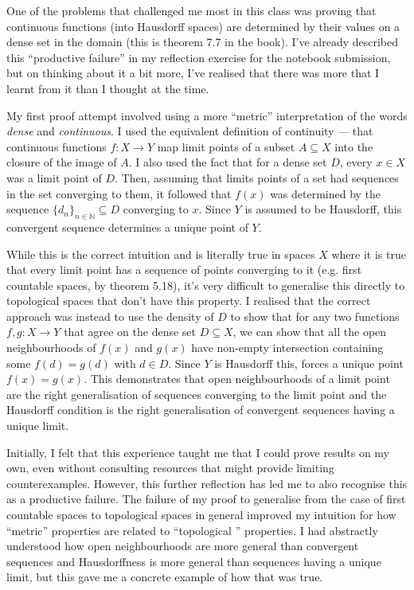 \documentclass[12 pt, letterpaper]{hmcpset}
\begin{document}
\begin{solution}
	One of the problems that challenged me most in this class was proving that continuous functions (into Hausdorff spaces) are determined by their values on a dense set in the domain (this is theorem 7.7 in the book). I've already described this ``productive failure'' in my reflection exercise for the notebook submission, but on thinking about it a bit more, I've realised that there was more that I learnt from it than I thought at the time.

	My first proof attempt involved using a more ``metric'' interpretation of the words \emph{dense} and \emph{continuous}. I used the equivalent definition of continuity --- that continuous functions $f : X \to Y$ map limit points of a subset $A \subseteq X$ into the closure of the image of $A$. I also used the fact that for a dense set $D$, every $x \in X$ was a limit point of $D$. Then, assuming that limits points of a set had sequences in the set converging to them, it followed that $f(x)$ was determined by the sequence $\{ d_{n} \}_{n \in \mathbb{N}} \subseteq D$ converging to $x$. Since $Y$ is assumed to be Hausdorff, this convergent sequence determines a unique point of $Y$.

	While this is the correct intuition and is literally true in spaces $X$ where it is true that every limit point has a sequence of points converging to it (e.g. first countable spaces, by theorem 5.18), it's very difficult to generalise this directly to topological spaces that don't have this property. I realised that the correct approach was instead to use the density of $D$ to show that for any two functions $f, g : X \to Y$ that agree on the dense set $D \subseteq X$, we can show that all the open neighbourhoods of $f(x)$ and $g(x)$ have non-empty intersection containing some $f(d) = g(d)$ with $d \in D$. Since $Y$ is Hausdorff this, forces a unique point $f(x) = g(x)$. This demonstrates that open neighbourhoods of a limit point are the right generalisation of sequences converging to the limit point and the Hausdorff condition is the right generalisation of convergent sequences having a unique limit.

	Initially, I felt that this experience taught me that I could prove results on my own, even without consulting resources that might provide limiting counterexamples. However, this further reflection has led me to also recognise this as a productive failure. The failure of my proof to generalise from the case of first countable spaces to topological spaces in general improved my intuition for how ``metric'' properties are related to ``topological '' properties. I had abstractly understood how open neighbourhoods are more general than convergent sequences and Hausdorffness is more general than sequences having a unique limit, but this gave me a concrete example of how that was true.


\end{solution}
\end{document}
